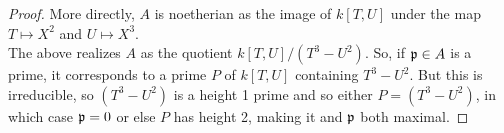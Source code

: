 \begin{proof}
	More directly, $A$ is noetherian as the image of $k[T,U]$ under the map $T \mapsto X^2$ and $U \mapsto X^3$. \\
	
	The above realizes $A$ as the quotient $k[T,U]/(T^3-U^2)$. So, if $\mathfrak{p} \in A$ is a prime, it corresponds to a prime $P$ of $k[T,U]$ containing $T^3-U^2$. But this is irreducible, so $(T^3-U^2)$ is a height 1 prime and so either $P = (T^3-U^2)$, in which case $\mathfrak{p} = 0$ or else $P$ has height 2, making it and $\mathfrak{p}$ both maximal.
\end{proof}
